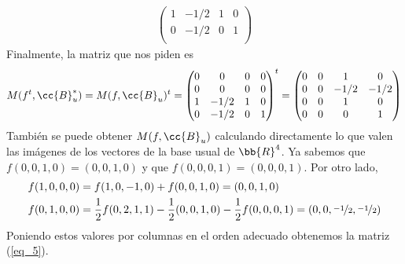 \documentclass[12pt]{article}
\begin{document}
\begin{ejercicio}[2.5 puntos]
\begin{enumerate}
\begin{align*}
\begin{pmatrix}
                    1 & -1/2 & 1 & 0 \\
                    0 & -1/2 & 0 & 1 \\
                \end{pmatrix}
            \end{align*}
            Finalmente, la matriz que nos piden es
            \begin{gather*}
                M(f^t, \cc{B}_u^*) = M(f, \cc{B}_u)^t =
                \begin{pmatrix}
                    0 & 0 & 0 & 0 \\
                    0 & 0 & 0 & 0 \\
                    1 & -1/2 & 1 & 0 \\
                    0 & -1/2 & 0 & 1 \\
                \end{pmatrix}^t
                =
                \begin{pmatrix} 
                    0 & 0 & 1 & 0 \\
                    0 & 0 & -1/2 & -1/2 \\
                    0 & 0 & 1 & 0 \\
                    0 & 0 & 0 & 1 \\
                \end{pmatrix}
            \end{gather*}
            También se puede obtener $M(f, \cc{B}_u)$ calculando directamente lo que valen las imágenes de los vectores de la base usual de $\bb{R}^4$. Ya sabemos que $f(0,0,1,0) = (0,0,1,0)$ y que $f(0,0,0,1) = (0,0,0,1)$. Por otro lado,
            \begin{align*}
                f(1,0,0,0) &= f(1,0,-1,0) + f(0,0,1,0) = (0,0,1,0)\\
                f(0,1,0,0) &= \frac{1}{2} f(0,2,1,1) - \frac{1}{2}(0,0,1,0) - \frac{1}{2}f(0,0,0,1) = (0,0,\nicefrac{-1}{2}, \nicefrac{-1}{2})
            \end{align*} 
            Poniendo estos valores por columnas en el orden adecuado obtenemos la matriz (\ref{eq_5}).
        \end{enumerate}
    \end{ejercicio}
\end{document}
